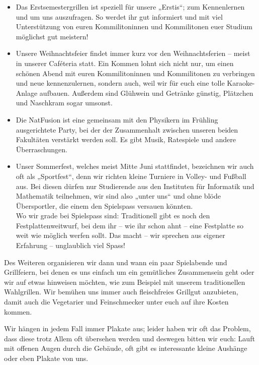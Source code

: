 \begin{itemize}
    \item Das Erstsemestergrillen ist speziell für unsere „Erstis“; zum Kennenlernen und um uns auszufragen.
          So werdet ihr gut informiert und mit viel Unterstützung von euren Kommilitoninnen und Kommilitonen euer Studium möglichst gut meistern!
    \item Unsere Weihnachtsfeier findet immer kurz vor den Weihnachtsferien -- meist in unserer Caféteria statt.
          Ein Kommen lohnt sich nicht nur, um einen schönen Abend mit euren Kommilitoninnen und Kommilitonen zu verbringen und neue kennenzulernen,
          sondern auch, weil wir für euch eine tolle Karaoke-Anlage aufbauen.
          Außerdem sind Glühwein und Getränke günstig, Plätzchen und Naschkram sogar umsonst.
    \item Die NatFusion ist eine gemeinsam mit den Physikern im Frühling ausgerichtete Party,
          bei der der Zusammenhalt zwischen unseren beiden Fakultäten verstärkt werden soll.
          Es gibt Musik, Ratespiele und andere Überraschungen.
    \item Unser Sommerfest, welches meist Mitte Juni stattfindet, bezeichnen wir auch oft als „Sportfest“,
          denn wir richten kleine Turniere in Volley- und Fußball aus.
          Bei diesen dürfen nur Studierende aus den Instituten für Informatik und Mathematik teilnehmen, wir sind also „unter uns“
          und ohne blöde Übersportler, die einem den Spielspass versauen könnten.\\
          Wo wir grade bei Spielspass sind: Traditionell gibt es noch den Festplattenweitwurf,
          bei dem ihr -- wie ihr schon ahnt -- eine Festplatte so weit wie möglich werfen sollt.
          Das macht -- wir sprechen aus eigener Erfahrung -- unglaublich viel Spass!
\end{itemize}

Des Weiteren organisieren wir dann und wann ein paar Spielabende und Grillfeiern, bei denen es uns einfach um ein gemütliches Zusammensein geht oder wir auf etwas hinweisen möchten, wie zum Beispiel mit unserem traditionellen Wahlgrillen.
Wir bemühen uns immer auch fleischfreies Grillgut anzubieten, damit auch die Vegetarier und Feinschmecker unter euch auf ihre Kosten kommen.

Wir hängen in jedem Fall immer Plakate aus; leider haben wir oft das Problem, dass diese trotz Allem oft übersehen werden und deswegen bitten wir euch:
Lauft mit offenen Augen durch die Gebäude, oft gibt es interessante kleine Aushänge oder eben Plakate von uns.

